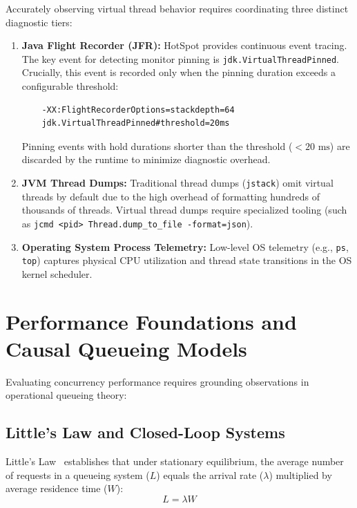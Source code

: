 Accurately observing virtual thread behavior requires coordinating three distinct diagnostic tiers:
\begin{enumerate}
  \item \textbf{Java Flight Recorder (JFR):} HotSpot provides continuous event tracing. The key event for detecting monitor pinning is \texttt{jdk.VirtualThreadPinned}. Crucially, this event is recorded only when the pinning duration exceeds a configurable threshold:
    \begin{verbatim}
    -XX:FlightRecorderOptions=stackdepth=64
    jdk.VirtualThreadPinned#threshold=20ms
    \end{verbatim}
    Pinning events with hold durations shorter than the threshold ($< 20\text{ ms}$) are discarded by the runtime to minimize diagnostic overhead.
  \item \textbf{JVM Thread Dumps:} Traditional thread dumps (\texttt{jstack}) omit virtual threads by default due to the high overhead of formatting hundreds of thousands of threads. Virtual thread dumps require specialized tooling (such as \texttt{jcmd <pid> Thread.dump\_to\_file -format=json}).
  \item \textbf{Operating System Process Telemetry:} Low-level OS telemetry (e.g., \texttt{ps}, \texttt{top}) captures physical CPU utilization and thread state transitions in the OS kernel scheduler.
\end{enumerate}

\section{Performance Foundations and Causal Queueing Models}
\label{sec:queueing-foundations}

Evaluating concurrency performance requires grounding observations in operational queueing theory:

\subsection{Little's Law and Closed-Loop Systems}
Little's Law~\cite{Little1961} establishes that under stationary equilibrium, the average number of requests in a queueing system ($L$) equals the arrival rate ($\lambda$) multiplied by average residence time ($W$):
\begin{equation}
  \label{eq:littles-law}
  L = \lambda W
\end{equation}

